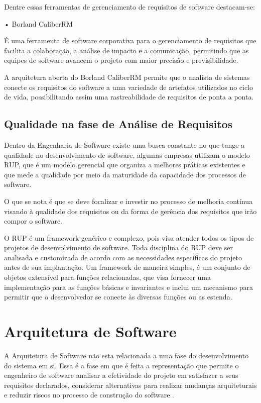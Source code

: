 Dentre essas ferramentas de gerenciamento de requisitos de software
destacam-se:

• Borland CaliberRM

É uma ferramenta de software corporativa para o gerenciamento de requisitos
que facilita a colaboração, a análise de impacto e a comunicação, permitindo que as
equipes de software avancem o projeto com maior precisão e previsibilidade.

A arquitetura aberta do Borland CaliberRM permite que o analista de sistemas
conecte os requisitos do software a uma variedade de artefatos utilizados no ciclo de
vida, possibilitando assim uma rastreabilidade de requisitos de ponta a ponta.

\subsection{Qualidade na fase de Análise de Requisitos}
\label{subsec:qualidadeAnalise}

Dentro da Engenharia de Software existe uma busca constante no que tange
a qualidade no desenvolvimento de software, algumas empresas utilizam o modelo
RUP, que é um modelo gerencial que organiza a
melhores práticas existentes e que mede a qualidade por meio da maturidade da
capacidade dos processos de software.

O que se nota é que se deve focalizar e investir no processo de melhoria
contínua visando à qualidade dos requisitos ou da forma de gerência dos requisitos
que irão compor o software.

O RUP é um framework genérico e complexo,
pois visa atender todos os tipos de projetos de desenvolvimento de software. Toda
disciplina do RUP deve ser analisada e customizada de acordo com as
necessidades específicas do projeto antes de sua implantação. Um framework de
maneira simples, é um conjunto de objetos extensível para funções relacionadas,
que visa fornecer uma implementação para as funções básicas e invariantes e inclui
um mecanismo para permitir que o desenvolvedor se conecte às diversas funções
ou as estenda.

\section{Arquitetura de Software}
\label{sec:arquiteturaSw}

A Arquitetura de Software não esta relacionada a uma fase do desenvolvimento do
sistema em si. Essa é a fase em que é feita a representação que permite o engenheiro 
de software analisar a efetividade do projeto em satisfazer a seus requisitos 
declarados, considerar alternativas para realizar mudanças arquiteturais e
reduzir riscos no processo de construção do software \cite{Pressman:2010}.
